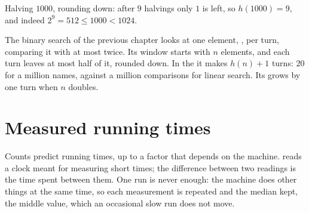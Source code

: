 \label{out:g11:cost-of-an-algorithm:halvings}

\begin{omfigure}

{\small Halving $1000$, rounding down: after $9$ halvings only $1$ is left, so $h(1000) = 9$, and indeed
$2^9 = 512 \le 1000 < 1024$.}
\end{omfigure}

The binary search of the previous chapter looks at one element, , per turn, comparing it with 
at most twice. Its window starts with $n$ elements, and each turn leaves at most half of it, rounded down. In the  it makes $h(n) + 1$ turns: $20$ for a million names, against a million comparisons for linear search. Its 
grows by one turn when $n$ doubles.

\section{Measured running times}\label{sec:g11:cost-of-an-algorithm:measured}

Counts predict running times, up to a factor that depends on the machine.  reads a clock
meant for measuring short times; the difference between two readings is the time spent between them. One run is
never enough: the machine does other things at the same time, so each measurement is repeated and the median kept, the
middle value, which an occasional slow run does not move.

\label{lst:g11:cost-of-an-algorithm:measure-sorts}

